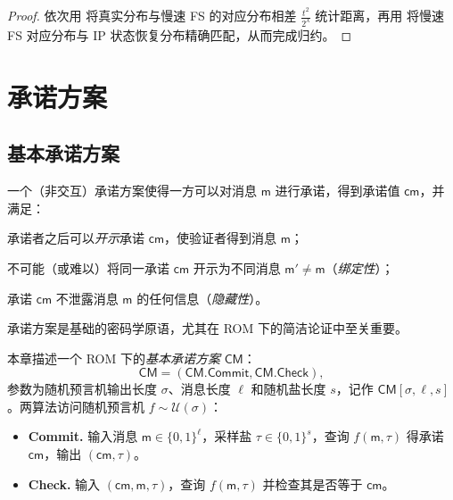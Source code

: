 \documentclass[american,singlepageview]{snargs-book-zh}
\newcommand{\Bits}{\{0,1\}}
\newcommand{\ProtoSalt}{\tau}
\newcommand{\ROFunction}{f}
\newcommand{\ROQueryBound}{t}
\newcommand{\RODistribution}[1]{\mathcal{U}(#1)}
\newcommand{\SecurityParameter}{\lambda}
\newcommand{\ROOutputSize}{\sigma}
\newcommand{\CMSymbol}{\mathsf{CM}}
\newcommand{\CMConstructor}[3]{\CMSymbol[#1,#2,#3]}
\newcommand{\CMCommit}{\CMSymbol.\mathsf{Commit}}
\newcommand{\CMCheck}{\CMSymbol.\mathsf{Check}}
\newcommand{\CMMessageLength}{\ell}
\newcommand{\CMSaltSize}{s}
\newcommand{\CMCommitment}{\mathsf{cm}}
\newcommand{\CMMessage}{\mathsf{m}}
\newcommand{\CMSaltString}{\ProtoSalt}
\newcommand{\FSErrorExpression}[1][\ROQueryBound]{\frac{#1^2}{2^{\SecurityParameter}}}
\begin{document}
\begin{proof}
依次用  将真实分布与慢速 FS 的对应分布相差 $\FSErrorExpression$ 统计距离，再用  将慢速 FS 对应分布与 IP 状态恢复分布精确匹配，从而完成归约。
\end{proof}

\part{承诺方案}
\label{part:commitment-schemes}


\chapter{基本承诺方案}
\label{chapter:basic-commitment}

一个（非交互）承诺方案使得一方可以对消息 $\CMMessage$ 进行承诺，得到承诺值 $\CMCommitment$，并满足：
\begin{inparaenum}[(a)]
  \item 承诺者之后可以\emph{开示}承诺 $\CMCommitment$，使验证者得到消息 $\CMMessage$；
  \item 不可能（或难以）将同一承诺 $\CMCommitment$ 开示为不同消息 $\CMMessage'\neq\CMMessage$（\emph{绑定性}）；
  \item 承诺 $\CMCommitment$ 不泄露消息 $\CMMessage$ 的任何信息（\emph{隐藏性}）。
\end{inparaenum}
承诺方案是基础的密码学原语，尤其在 ROM 下的简洁论证中至关重要。

本章描述一个 ROM 下的\emph{基本承诺方案} $\CMSymbol$：
\[
\CMSymbol = (\CMCommit,\CMCheck),
\]
参数为随机预言机输出长度 $\ROOutputSize$、消息长度 $\CMMessageLength$ 和随机盐长度 $\CMSaltSize$，记作 $\CMConstructor{\ROOutputSize}{\CMMessageLength}{\CMSaltSize}$。两算法访问随机预言机 $\ROFunction\sim\RODistribution{\ROOutputSize}$：
\begin{itemize}
  \item \textbf{Commit.} 输入消息 $\CMMessage\in\Bits^{\CMMessageLength}$，采样盐 $\CMSaltString\in\Bits^{\CMSaltSize}$，查询 $\ROFunction(\CMMessage,\CMSaltString)$ 得承诺 $\CMCommitment$，输出 $(\CMCommitment,\CMSaltString)$。
  \item \textbf{Check.} 输入 $(\CMCommitment,\CMMessage,\CMSaltString)$，查询 $\ROFunction(\CMMessage,\CMSaltString)$ 并检查其是否等于 $\CMCommitment$。
\end{itemize}
\end{document}
